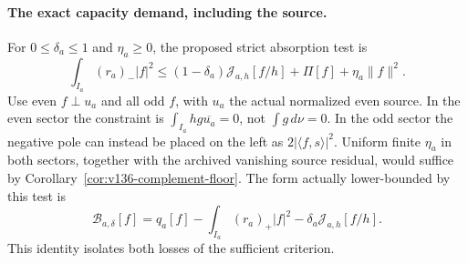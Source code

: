 \paragraph{The exact capacity demand, including the source.}
For $0\le\delta_a\le1$ and $\eta_a\ge0$, the proposed strict absorption test is
\begin{equation}\label{eq:v150-capacity-demand}
 \int_{I_a}(r_a)_-|f|^2\le
 (1-\delta_a)\mathcal J_{a,h}[f/h]+\Pi[f]+\eta_a\|f\|^2.
\end{equation}
Use even $f\perp u_a$ and all odd $f$, with $u_a$ the actual normalized
even source. In the even sector the constraint is
$\int_{I_a}h g\overline{u_a}=0$, not $\int g\,d\nu=0$.
In the odd sector the negative pole can instead be placed on the left
as $2|\langle f,s\rangle|^2$. Uniform finite $\eta_a$ in both sectors,
together with the archived vanishing source residual, would suffice
by Corollary~\ref{cor:v136-complement-floor}.
The form actually lower-bounded by this test is
\begin{equation}\label{eq:v150-budget-form}
 \mathcal B_{a,\delta}[f]
 =q_a[f]-\int_{I_a}(r_a)_+|f|^2
                  -\delta_a\mathcal J_{a,h}[f/h].
\end{equation}
This identity isolates both losses of the sufficient criterion.

